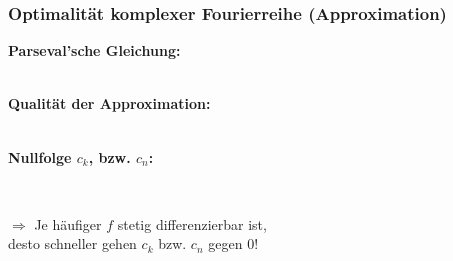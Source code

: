 			\subsubsection{Optimalität komplexer Fourierreihe (Approximation)}
				\begin{minipage}[t]{0.5\textwidth}
					\textbf{Parseval'sche Gleichung:}\\[3pt]
					\\[6pt]
				\end{minipage}
				\begin{minipage}[t]{0.5\textwidth}
					\textbf{Qualität der Approximation:}\\[3pt]
					\\[3pt]
				\end{minipage}
				\textbf{Nullfolge $c_k$, bzw. $c_n$:}\\[3pt]
				\begin{minipage}[t]{0.5\textwidth}
					\\[3pt]
				\end{minipage}
				\begin{minipage}[t]{0.5\textwidth}
					$\Rightarrow$ Je häufiger $f$ stetig differenzierbar ist,\\[3pt]
					desto schneller gehen $c_k$ bzw. $c_n$ gegen $0$!\\[3pt]
				\end{minipage}
				
